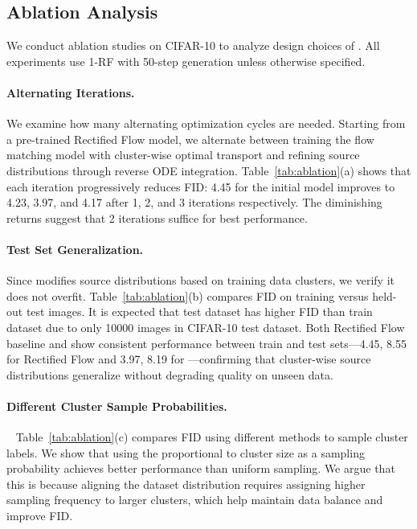 \subsection{Ablation Analysis}

We conduct ablation studies on CIFAR-10 to analyze design choices of \method{}. All experiments use 1-RF with 50-step generation unless otherwise specified.


\paragraph{Alternating Iterations.} We examine how many alternating optimization cycles are needed. Starting from a pre-trained Rectified Flow model, we alternate between training the flow matching model with cluster-wise optimal transport and refining source distributions through reverse ODE integration. Table~\ref{tab:ablation}(a) shows that each iteration progressively reduces FID: 4.45 for the initial model improves to 4.23, 3.97, and 4.17 after 1, 2, and 3 iterations respectively. The diminishing returns suggest that 2 iterations suffice for best performance.

\paragraph{Test Set Generalization.}
Since \method{} modifies source distributions based on training data clusters, we verify it does not overfit. Table~\ref{tab:ablation}(b) compares FID on training versus held-out test images. It is expected that test dataset has higher FID than train dataset due to only 10000 images in CIFAR-10 test dataset. Both Rectified Flow baseline and \method{} show consistent performance between train and test sets—4.45, 8.55 for Rectified Flow and 3.97, 8.19 for \method{}—confirming that cluster-wise source distributions generalize without degrading quality on unseen data.

\paragraph{Different Cluster Sample Probabilities.}~\label{abl:sample_method}
Table~\ref{tab:ablation}(c) compares FID using different methods to sample cluster labels. We show that using the proportional to cluster size as a sampling probability achieves better performance than uniform sampling. We argue that this is because aligning the dataset distribution requires assigning higher sampling frequency to larger clusters, which help maintain data balance and improve FID.

